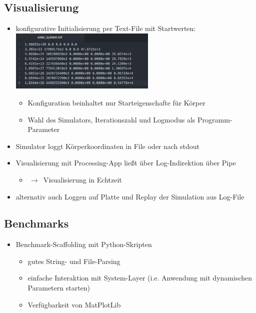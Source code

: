 \documentclass{beamer}
\begin{document}
\subsection{Visualisierung}
\begin{frame}
\begin{itemize}
  \item konfigurative Initialisierung per Text-File mit Startwerten:
  \includegraphics[width=7cm]{img/config_solar.png}
  \begin{itemize}
    \item Konfiguration beinhaltet nur Starteigenschafte für Körper
    \item Wahl des Simulators, Iterationszahl und Logmodus als Programm-Parameter
  \end{itemize}

  \item Simulator loggt Körperkoordinaten in File oder nach stdout
  \item Visualisierung mit Processing-App ließt über Log-Indirektion über Pipe
  \begin{itemize}
    \item $\,\to\,$ Visualisierung in Echtzeit
  \end{itemize}
  \item alternativ auch Loggen auf Platte und Replay der Simulation aus Log-File
\end{itemize}
\end{frame}

\subsection{Benchmarks}
\begin{frame}
\begin{itemize}
  \item Benchmark-Scaffolding mit Python-Skripten
  \begin{itemize}
    \item gutes String- und File-Parsing
    \item einfache Interaktion mit System-Layer (i.e. Anwendung mit dynamischen Parametern starten)
    \item Verfügbarkeit von MatPlotLib
  \end{itemize}
\end{itemize}
\end{frame}
\end{document}

